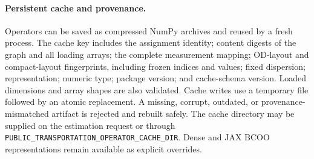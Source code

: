 \paragraph{Persistent cache and provenance.}
Operators can be saved as compressed NumPy archives and reused by a fresh
process. The cache key includes the assignment identity; content digests of the
graph and all loading arrays; the complete measurement mapping; OD-layout and
compact-layout fingerprints, including frozen indices and values; fixed
dispersion; representation; numeric type; package version; and cache-schema
version. Loaded dimensions and array shapes are also validated. Cache writes
use a temporary file followed by an atomic replacement. A missing, corrupt,
outdated, or provenance-mismatched artifact is rejected and rebuilt safely.
The cache directory may be supplied on the estimation request or through
\texttt{PUBLIC\_TRANSPORTATION\_OPERATOR\_CACHE\_DIR}. Dense and JAX BCOO
representations remain available as explicit overrides.

